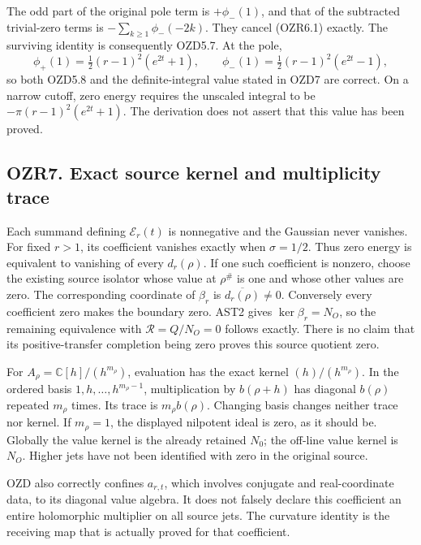 The odd part of the original pole term is \(+\phi_-(1)\), and that of
the subtracted trivial-zero terms is \(-\sum_{k\ge1}\phi_-(-2k)\). They
cancel (OZR6.1) exactly. The surviving identity is consequently OZD5.7.
At the pole, \[
\phi_+(1)=\tfrac12(r-1)^2(e^{2t}+1),\qquad
\phi_-(1)=\tfrac12(r-1)^2(e^{2t}-1),
\] so both OZD5.8 and the definite-integral value stated in OZD7 are
correct. On a narrow cutoff, zero energy requires the unscaled integral
to be \(-\pi(r-1)^2(e^{2t}+1)\). The derivation does not assert that
this value has been proved.

\subsection{OZR7. Exact source kernel and multiplicity
trace}\label{ozr7.-exact-source-kernel-and-multiplicity-trace}

Each summand defining \(\mathcal E_r(t)\) is nonnegative and the
Gaussian never vanishes. For fixed \(r>1\), its coefficient vanishes
exactly when \(\sigma=1/2\). Thus zero energy is equivalent to vanishing
of every \(d_r(\rho)\). If one such coefficient is nonzero, choose the
existing source isolator whose value at \(\rho^\#\) is one and whose
other values are zero. The corresponding coordinate of \(\beta_r\) is
\(\overline{d_r(\rho)}\ne0\). Conversely every coefficient zero makes
the boundary zero. AST2 gives \(\ker\beta_r=N_O\), so the remaining
equivalence with \(\mathcal R=Q/N_O=0\) follows exactly. There is no
claim that its positive-transfer completion being zero proves this
source quotient zero.

For \(A_\rho=\mathbb C[h]/(h^{m_\rho})\), evaluation has the exact
kernel \((h)/(h^{m_\rho})\). In the ordered basis
\(1,h,\ldots,h^{m_\rho-1}\), multiplication by \(b(\rho+h)\) has
diagonal \(b(\rho)\) repeated \(m_\rho\) times. Its trace is
\(m_\rho b(\rho)\). Changing basis changes neither trace nor kernel. If
\(m_\rho=1\), the displayed nilpotent ideal is zero, as it should be.
Globally the value kernel is the already retained \(N_0\); the off-line
value kernel is \(N_O\). Higher jets have not been identified with zero
in the original source.

OZD also correctly confines \(a_{r,t}\), which involves conjugate and
real-coordinate data, to its diagonal value algebra. It does not falsely
declare this coefficient an entire holomorphic multiplier on all source
jets. The curvature identity is the receiving map that is actually
proved for that coefficient.

